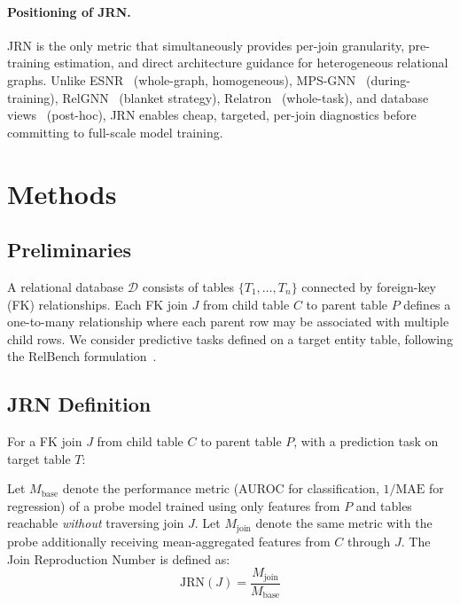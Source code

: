 \documentclass[11pt,letterpaper]{article}
\begin{document}
\paragraph{Positioning of JRN.}
JRN is the only metric that simultaneously provides per-join granularity, pre-training estimation, and direct architecture guidance for heterogeneous relational graphs. Unlike ESNR~\citep{Dong2023} (whole-graph, homogeneous), MPS-GNN~\citep{Ferrini2024a, Ferrini2024b} (during-training), RelGNN~\citep{Chen2025} (blanket strategy), Relatron~\citep{Chen2026} (whole-task), and database views~\citep{Rissaki2025} (post-hoc), JRN enables cheap, targeted, per-join diagnostics before committing to full-scale model training.

\section{Methods}
\label{sec:methods}

\subsection{Preliminaries}

A relational database $\mathcal{D}$ consists of tables $\{T_1, \ldots, T_n\}$ connected by foreign-key (FK) relationships. Each FK join $J$ from child table $C$ to parent table $P$ defines a one-to-many relationship where each parent row may be associated with multiple child rows. We consider predictive tasks defined on a target entity table, following the RelBench formulation~\citep{Robinson2024}.

\subsection{JRN Definition}

For a FK join $J$ from child table $C$ to parent table $P$, with a prediction task on target table $T$:

Let $M_{\text{base}}$ denote the performance metric (AUROC for classification, $1/\text{MAE}$ for regression) of a probe model trained using only features from $P$ and tables reachable \emph{without} traversing join $J$. Let $M_{\text{join}}$ denote the same metric with the probe additionally receiving mean-aggregated features from $C$ through $J$. The Join Reproduction Number is defined as:
\begin{equation}
\text{JRN}(J) = \frac{M_{\text{join}}}{M_{\text{base}}}
\label{eq:jrn}
\end{equation}
\end{document}
